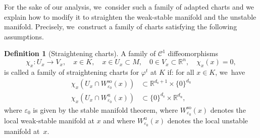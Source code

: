\documentclass[JEP,XML,SOM,Unicode,NoEqCountersInSection,NoFloatCountersInSection,published]{cedram}
\newcommand{\rs}{\mathrm{s}}
\newcommand{\rso}{\mathrm{so}}
\newcommand{\ru}{\mathrm{u}}
\theoremstyle{definition}
\newtheorem{definition}{Definition}[section]
\theoremstyle{plain}
\newcommand{\Ccal}{\mathcal{C}}
\newcommand{\R}{\mathbb{R}}
\begin{document}
\begin{appendix}
For the sake of our analysis, we~consider such a family of adapted charts and we explain how to modify it to straighten the weak-stable manifold and the unstable manifold. Precisely, we~construct a family of charts satisfying the following assumptions.

\begin{definition}[Straightening charts]\label{def: straightening charts}
A family of $\Ccal^{1}$ diffeomorphisms
\[
\chi_x: U_x \to V_x, \quad x \in K,\quad x \in U_x \subset M, \quad 0 \in V_x \subset \R^n, \quad \chi_x (x) = 0,
\]
is called a family of straightening charts for $\varphi^t$ at $K$ if: for all $x \in K$, we~have
\begin{align*}
\chi_x (U_x \cap W_{\varepsilon_0}^{\rso} (x)) &\subset \R^{d_\rs + 1} \times \{0\}^{d_\ru} \\
\chi_x (U_x \cap W_{\varepsilon_0}^{\ru} (x)) &\subset \{0\}^{d_\rs} \times \R^{d_\ru},
\end{align*}
where $\varepsilon_0$ is given by the stable manifold theorem, where $W_{\varepsilon_0}^{\rso} (x)$ denotes the local weak-stable manifold at $x$ and where $W_{\varepsilon_0}^{\ru} (x)$ denotes the local unstable manifold at~$x$.
\end{definition}


\end{appendix}
\end{document}
